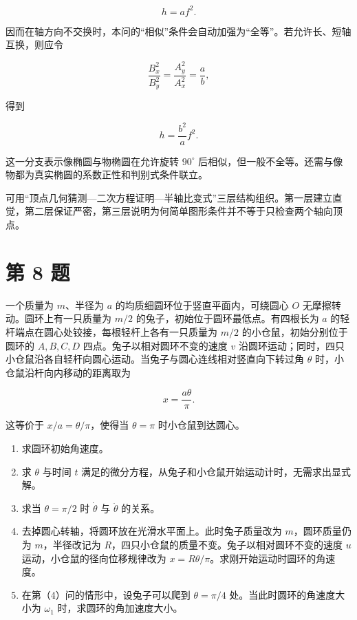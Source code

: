 \documentclass[12pt,a4paper,UTF8]{ctexart}
\newcommand{\tightlist}{\setlength{\itemsep}{0pt}\setlength{\parskip}{0pt}}
\begin{document}
\[h=af^2.\]

因而在轴方向不交换时，本问的``相似''条件会自动加强为``全等''。若允许长、短轴互换，则应令

\[\frac{B_x^2}{B_y^2}
=\frac{A_y^2}{A_x^2}=\frac ab,\]

得到

\[\boxed{h=\frac{b^2}{a}f^2}.\]

这一分支表示像椭圆与物椭圆在允许旋转 \(90^\circ\)
后相似，但一般不全等。还需与像物都为真实椭圆的系数正性和判别式条件联立。

可用``顶点几何猜测---二次方程证明---半轴比变式''三层结构组织。第一层建立直觉，第二层保证严密，第三层说明为何简单图形条件并不等于只检查两个轴向顶点。

\newpage

\section{第 8 题}\label{ux7b2c-8-ux9898}

一个质量为 \(m\)、半径为 \(a\) 的均质细圆环位于竖直平面内，可绕圆心
\(O\) 无摩擦转动。圆环上有一只质量为 \(m/2\)
的兔子，初始位于圆环最低点。有四根长为 \(a\)
的轻杆端点在圆心处铰接，每根轻杆上各有一只质量为 \(m/2\)
的小仓鼠，初始分别位于圆环的 \(A,B,C,D\) 四点。兔子以相对圆环不变的速度
\(v\)
沿圆环运动；同时，四只小仓鼠沿各自轻杆向圆心运动。当兔子与圆心连线相对竖直向下转过角
\(\theta\) 时，小仓鼠沿杆向内移动的距离取为

\[x=\frac{a\theta}{\pi}.\]

这等价于 \(x/a=\theta/\pi\)，使得当 \(\theta=\pi\) 时小仓鼠到达圆心。

\begin{enumerate}
\def\labelenumi{\arabic{enumi}.}
\tightlist
\item
  求圆环初始角速度。
\item
  求 \(\theta\) 与时间 \(t\)
  满足的微分方程，从兔子和小仓鼠开始运动计时，无需求出显式解。
\item
  求当 \(\theta=\pi/2\) 时 \(\dot\theta\) 与 \(\ddot\theta\) 的关系。
\item
  去掉圆心转轴，将圆环放在光滑水平面上。此时兔子质量改为
  \(m\)，圆环质量仍为 \(m\)，半径改记为
  \(R\)，四只小仓鼠的质量不变。兔子以相对圆环不变的速度 \(u\)
  运动，小仓鼠的径向位移规律改为
  \(x=R\theta/\pi\)。求刚开始运动时圆环的角速度。
\item
  在第（4）问的情形中，设兔子可以爬到 \(\theta=\pi/4\)
  处。当此时圆环的角速度大小为 \(\omega_1\) 时，求圆环的角加速度大小。
\end{enumerate}
\end{document}
